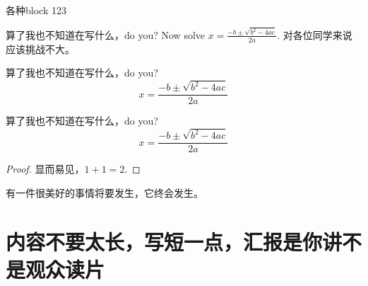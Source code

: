 \documentclass[aspectratio=1610,linespread=1.2]{ctexbeamer}
\begin{document}
\begin{frame}[allowframebreaks]{各种block 123}
    \begin{exampleblock}{算了我也不知道在写什么，do you?}
    Now solve $x = \frac{-b \pm \sqrt{b^2 -4ac}}{2a}$. 对各位同学来说应该挑战不大。
    \end{exampleblock}
    
    \begin{alertblock}{算了我也不知道在写什么，do you?}
    \[ x = \frac{-b \pm \sqrt{b^2 -4ac}}{2a} \]
    \end{alertblock}
    
    \begin{block}{算了我也不知道在写什么，do you?}
    \[ x = \frac{-b \pm \sqrt{b^2 -4ac}}{2a} \]
    \end{block}
    
    \begin{proof}
    显而易见，$1+1=2$.
    \end{proof}

    \begin{theorem}
    有一件很美好的事情将要发生，它终会发生。
    \end{theorem}
\end{frame}

\section{内容不要太长，写短一点，汇报是你讲不是观众读片}
    
\end{document}
